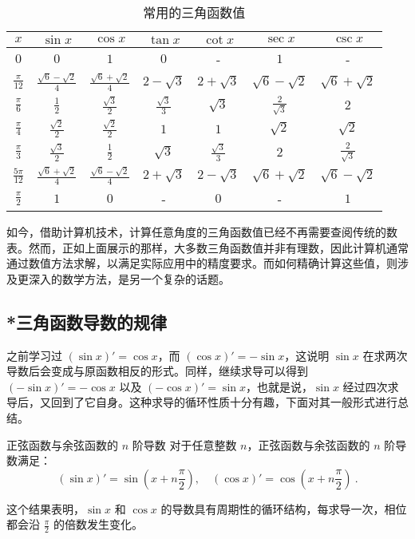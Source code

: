 \begin{table}[ht]
\centering
\caption{常用的三角函数值}\label{tab_HsTFFv1}
\begin{tabular}{|c|c|c|c|c|c|c|}
\hline
$x$  & $\sin x$ & $\cos x$ & $\tan x$ & $\cot x$& $\sec x$ & $\csc x$  \\
\hline
$0$ & $0$ & $1$ & $0$ &- & $1$ &-\\
\hline
$\displaystyle\frac{\pi}{12}$ & $\displaystyle\frac{\sqrt{6} - \sqrt{2}}{4}$ & $\displaystyle\frac{\sqrt{6} + \sqrt{2}}{4}$ & $2 - \sqrt{3}$ & $2 + \sqrt{3}$ & $\sqrt{6} - \sqrt{2}$ & $\sqrt{6} + \sqrt{2}$\\
\hline
$\displaystyle\frac{\pi}{6}$ & $\displaystyle\frac{1}{2}$ & $\displaystyle\frac{\sqrt{3}}{2}$ & $\displaystyle\frac{\sqrt{3}}{3}$ & $\sqrt{3}$ & $\displaystyle\frac{2}{\sqrt{3}}$ & $2$ \\
\hline
$\displaystyle\frac{\pi}{4}$ & $\displaystyle\frac{\sqrt{2}}{2}$ & $\displaystyle\frac{\sqrt{2}}{2}$ & $1$ & $1$ & $\sqrt{2}$ & $\sqrt{2}$ \\
\hline
$\displaystyle\frac{\pi}{3}$ & $\displaystyle\frac{\sqrt{3}}{2}$ & $\displaystyle\frac{1}{2}$ & $\sqrt{3}$ & $\displaystyle\frac{\sqrt{3}}{3}$ & $2$ & $\displaystyle\frac{2}{\sqrt{3}}$ \\
\hline
$\displaystyle\frac{5\pi}{12}$ & $\displaystyle\frac{\sqrt{6} + \sqrt{2}}{4}$ & $\displaystyle\frac{\sqrt{6} - \sqrt{2}}{4}$ & $2 + \sqrt{3}$ & $2 - \sqrt{3}$ & $\sqrt{6} + \sqrt{2}$ & $\sqrt{6} - \sqrt{2}$ \\
\hline
$\displaystyle\frac{\pi}{2}$ & $1$ & $0$ &- & $0$ &- & $1$ \\
\hline
\end{tabular}
\end{table}

如今，借助计算机技术，计算任意角度的三角函数值已经不再需要查阅传统的数表。然而，正如上面展示的那样，大多数三角函数值并非有理数，因此计算机通常通过数值方法求解，以满足实际应用中的精度要求。而如何精确计算这些值，则涉及更深入的数学方法，是另一个复杂的话题。


\subsection{*三角函数导数的规律}

之前学习过 $(\sin x)' = \cos x$，而 $(\cos x)' = -\sin x$，这说明 $\sin x$ 在求两次导数后会变成与原函数相反的形式。同样，继续求导可以得到 $(-\sin x)' = -\cos x$ 以及 $(-\cos x)' = \sin x$，也就是说，$\sin x$ 经过四次求导后，又回到了它自身。这种求导的循环性质十分有趣，下面对其一般形式进行总结。

\begin{corollary}{正弦函数与余弦函数的 $n$ 阶导数}
对于任意整数 $n$，正弦函数与余弦函数的 $n$ 阶导数满足：
\begin{equation}
(\sin x)' = \sin\left(x + n\frac{\pi}{2}\right), \quad
(\cos x)'= \cos\left(x + n\frac{\pi}{2}\right)~.
\end{equation}
\end{corollary}

这个结果表明，$\sin x$ 和 $\cos x$ 的导数具有周期性的循环结构，每求导一次，相位都会沿 $\frac{\pi}{2}$ 的倍数发生变化。